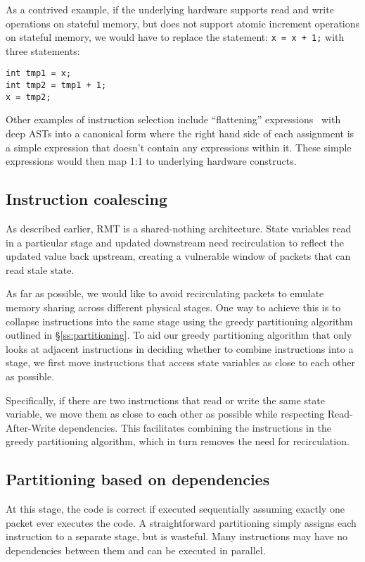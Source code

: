 As a contrived example, if the underlying hardware supports read and write
operations on stateful memory, but does not support atomic increment operations
on stateful memory, we would have to replace the statement: \texttt{x = x + 1;}
with three statements:
\begin{verbatim}
int tmp1 = x;
int tmp2 = tmp1 + 1;
x = tmp2;
\end{verbatim}

Other examples of instruction selection include ``flattening''
expressions~\cite{expression_flattening} with deep ASTs into a canonical form
where the right hand side of each assignment is a simple expression that
doesn't contain any expressions within it. These simple expressions would then
map 1:1 to underlying hardware constructs.

\subsection{Instruction coalescing}

As described earlier, RMT is a shared-nothing architecture. State variables
read in a particular stage and updated downstream need recirculation to reflect
the updated value back upstream, creating a vulnerable window of packets that
can read stale state.

As far as possible, we would like to avoid recirculating packets to emulate
memory sharing across different physical stages. One way to achieve this is to
collapse instructions into the same stage using the greedy partitioning
algorithm outlined in \S\ref{ss:partitioning}. To aid our greedy partitioning
algorithm that only looks at adjacent instructions in deciding whether to
combine instructions into a stage, we first move instructions that access state
variables as close to each other as possible.

Specifically, if there are two instructions that read or write the same state
variable, we move them as close to each other as possible while respecting
Read-After-Write dependencies. This facilitates combining the instructions in
the greedy partitioning algorithm, which in turn removes the need for
recirculation.

\subsection{Partitioning based on dependencies}

At this stage, the code is correct if executed sequentially assuming exactly
one packet ever executes the code. A straightforward partitioning simply
assigns each instruction to a separate stage, but is wasteful. Many
instructions may have no dependencies between them and can be executed in
parallel.

